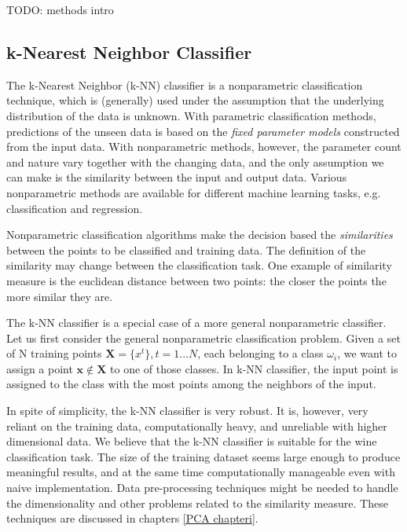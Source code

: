 TODO: methods intro

\subsection{k-Nearest Neighbor Classifier}
The k-Nearest Neighbor (k-NN) classifier is a nonparametric classification technique, which is (generally) used under the assumption that the underlying distribution of the data is unknown. With parametric classification methods, predictions of the unseen data is based on the \emph{fixed parameter models} constructed from the input data. With nonparametric methods, however, the parameter count and nature vary together with the changing data, and the only assumption we can make is the similarity between the input and output data. Various nonparametric methods are available for different machine learning tasks, e.g. classification and regression. \cite{alpaydin:2004:introduction} %

Nonparametric classification algorithms make the decision based the \emph{similarities} between the points to be classified and training data. The definition of the similarity may change between the classification task. One example of similarity measure is the euclidean distance between two points: the closer the points the more similar they are.

The k-NN classifier is a special case of a more general nonparametric classifier. Let us first consider the general nonparametric classification problem. Given a set of N training points  $\mathbf{X} = \{x^{t}\}, t=1...N$, each belonging to a class $\omega_{i}$, we want to assign a point $\mathbf{x} \notin \mathbf{X}$ to one of those classes. In k-NN classifier, the input point is assigned to the class with the most points among the neighbors of the input.

In spite of simplicity, the k-NN classifier is very robust. It is, however, very reliant on the
training data, computationally heavy, and unreliable with higher dimensional data. We believe that the k-NN classifier is suitable for the wine classification task. The size of the training dataset seems large enough to produce meaningful results, and at the same time computationally manageable even with naive implementation. Data pre-processing techniques might be needed to handle the dimensionality and other problems related to the similarity measure. These techniques are discussed in chapters \ref{PCA chapteri}.


